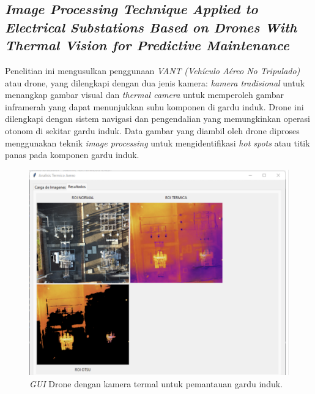 \subsection{\emph{Image Processing Technique Applied to Electrical
Substations Based on Drones With Thermal Vision
for Predictive Maintenance}}
Penelitian ini mengusulkan penggunaan \emph{VANT} \emph{(Vehículo Aéreo No Tripulado)} atau drone, yang dilengkapi dengan dua jenis kamera: \emph{kamera tradisional} untuk menangkap gambar visual dan \emph{thermal camera} untuk memperoleh gambar inframerah yang dapat menunjukkan suhu komponen di gardu induk. Drone ini dilengkapi dengan sistem navigasi dan pengendalian yang memungkinkan operasi otonom di sekitar gardu induk. Data gambar yang diambil oleh drone diproses menggunakan teknik \emph{image processing} untuk mengidentifikasi \emph{hot spots} atau titik panas pada komponen gardu induk.

\begin{figure}[H]
  \centering
  \includegraphics[scale=0.34]{gambar/bab2/drone.png}
  \caption{\emph{GUI} Drone dengan kamera termal untuk pemantauan gardu induk. \cite{Prieto2022}}
  \label{fig:Drone dengan kamera termal untuk pemantauan gardu induk}
\end{figure}

